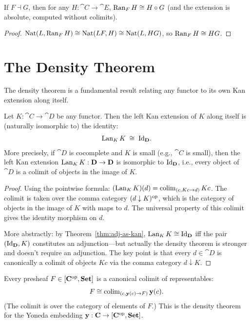 \begin{corollary}
If $F \dashv G$, then for any $H: \cat{C} \to \cat{E}$, $\operatorname{Ran}_F H \cong H \circ G$ (and the extension is absolute, computed without colimits).
\end{corollary}

\begin{proof}
$\operatorname{Nat}(L, \operatorname{Ran}_F H) \cong \operatorname{Nat}(LF, H) \cong \operatorname{Nat}(L, HG)$, so $\operatorname{Ran}_F H \cong HG$.
\end{proof}

\section{The Density Theorem}

The density theorem is a fundamental result relating any functor to its own Kan extension along itself.

\begin{theorem}
\label{thm:density}
Let $K: \cat{C} \to \cat{D}$ be any functor. Then the left Kan extension of $K$ along itself is (naturally isomorphic to) the identity:
\[
  \operatorname{Lan}_K K \;\cong\; \mathrm{Id}_{\mathbf{D}}.
\]
More precisely, if $\cat{D}$ is cocomplete and $K$ is small (e.g., $\cat{C}$ is small), then the left Kan extension $\operatorname{Lan}_K K: \mathbf{D} \to \mathbf{D}$ is isomorphic to $\mathrm{Id}_{\mathbf{D}}$, i.e., every object of $\cat{D}$ is a colimit of objects in the image of $K$.
\end{theorem}

\begin{proof}
Using the pointwise formula: $(\operatorname{Lan}_K K)(d) = \operatorname{colim}_{(c, Kc \to d)} Kc$. The colimit is taken over the comma category $(d \downarrow K)^{\mathrm{op}}$, which is the category of objects in the image of $K$ with maps to $d$. The universal property of this colimit gives the identity morphism on $d$.

More abstractly: by Theorem~\ref{thm:adj-as-kan}, $\operatorname{Lan}_K K \cong \mathrm{Id}_{\mathbf{D}}$ iff the pair $(\mathrm{Id}_{\mathbf{D}}, K)$ constitutes an adjunction—but actually the density theorem is stronger and doesn't require an adjunction. The key point is that every $d \in \cat{D}$ is canonically a colimit of objects $Kc$ via the comma category $d \downarrow K$.
\end{proof}

\begin{corollary}
Every presheaf $F \in [\mathbf{C}^{\mathrm{op}}, \mathbf{Set}]$ is a canonical colimit of representables:
\[
  F \cong \operatorname{colim}_{(c, \mathbf{y}(c) \to F)} \mathbf{y}(c).
\]
(The colimit is over the category of elements of $F$.) This is the density theorem for the Yoneda embedding $\mathbf{y}: \mathbf{C} \to [\mathbf{C}^{\mathrm{op}}, \mathbf{Set}]$.
\end{corollary}


